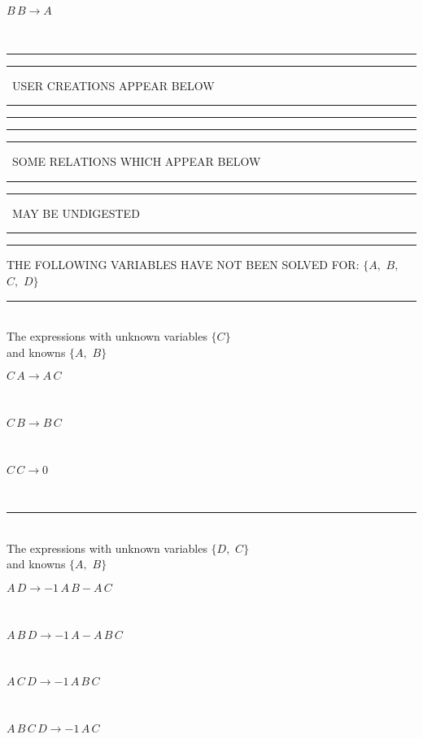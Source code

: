 \begin{minipage}{6in}
$
B\,
 B\rightarrow A
$
\end{minipage}\\
\rule[2pt]{6in}{1pt}\hfil\break
\rule[2.5pt]{1.701in}{1pt}
\ USER CREATIONS APPEAR BELOW\ 
\rule[2.5pt]{1.701in}{1pt}\hfil\break
\rule[2pt]{6in}{1pt}\hfil\break
\rule[2pt]{6in}{4pt}\hfil\break
\rule[2pt]{1.45in}{4pt}
\ SOME RELATIONS WHICH APPEAR BELOW\ 
\rule[2pt]{1.45in}{4pt}\hfil\break
\rule[2pt]{2.18in}{4pt}
\ MAY BE UNDIGESTED\ 
\rule[2pt]{2.18in}{4pt}\hfil\break
\rule[2pt]{6in}{4pt}\hfil\break
THE FOLLOWING VARIABLES HAVE NOT BEEN SOLVED FOR:\hfil\break
$\{A,
$ $
B,
$ $
C,
$ $
D\}$
\smallskip\\
\rule[3pt]{6in}{.7pt}\\
The expressions with unknown variables $\{C\}$\\
and knowns $\{A,
$ $
B\}$\smallskip\\
\begin{minipage}{6in}
$
C\,
 A\rightarrow A\,
 C
$
\end{minipage}\medskip \\
\begin{minipage}{6in}
$
C\,
 B\rightarrow B\,
 C
$
\end{minipage}\medskip \\
\begin{minipage}{6in}
$
C\,
 C\rightarrow 0
$
\end{minipage}\\
\rule[3pt]{6in}{.7pt}\\
The expressions with unknown variables $\{D,
$ $
C\}$\\
and knowns $\{A,
$ $
B\}$\smallskip\\
\begin{minipage}{6in}
$
A\,
 D\rightarrow -1\,
 A\,
 B - A\,
 C
$
\end{minipage}\medskip \\
\begin{minipage}{6in}
$
A\,
 B\,
 D\rightarrow -1\,
 A - A\,
 B\,
 C
$
\end{minipage}\medskip \\
\begin{minipage}{6in}
$
A\,
 C\,
 D\rightarrow -1\,
 A\,
 B\,
 C
$
\end{minipage}\medskip \\
\begin{minipage}{6in}
$
A\,
 B\,
 C\,
 D\rightarrow -1\,
 A\,
 C
$
\end{minipage}\\
\vspace{10pt}

